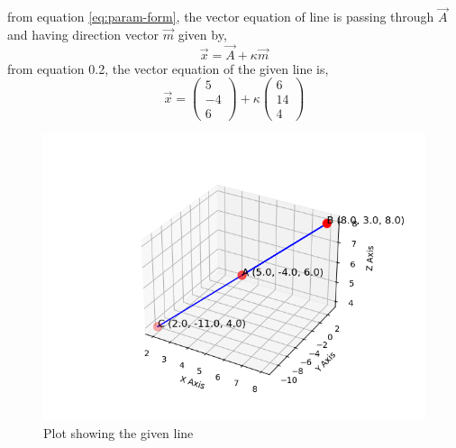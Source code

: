 \documentclass[journal]{IEEEtran}
\begin{document}
from equation \eqref{eq:param-form}, the vector equation of line is passing through $\vec{A}$ and having direction vector $\vec{m}$ given by,\\
\begin{equation}
    \vec{x}=\vec{A}+\kappa\vec{m}
\end{equation}
from  equation 0.2, the vector equation of the given line is,
\begin{equation*}
    \vec{x}=\begin{pmatrix}
        5\\
        -4\\
        6
    \end{pmatrix}+\kappa\begin{pmatrix}
        6\\
        14\\
        4
    \end{pmatrix}
\end{equation*}

 \begin{figure}[h!]
   \centering
   \includegraphics[width=0.7\linewidth]{figs/figure1.png.jpg}
   \caption{Plot showing the given line}
   \label{stemplot}
\end{figure}
\end{document}
